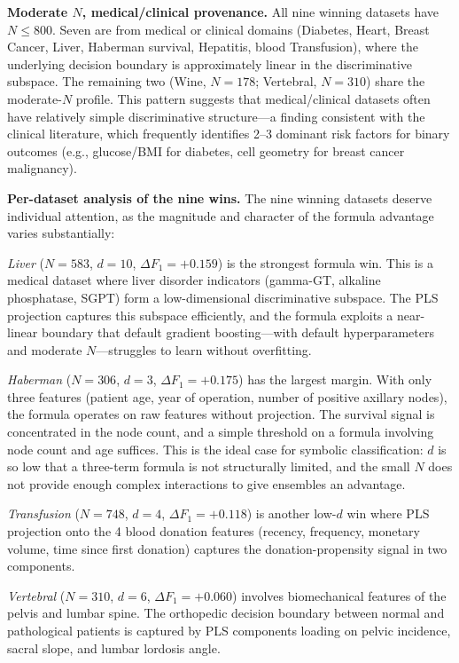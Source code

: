 \documentclass[journal]{IEEEtran}
\begin{document}
\textbf{Moderate $N$, medical/clinical provenance.}
All nine winning datasets have $N \leq 800$.  Seven are from
medical or clinical domains (Diabetes, Heart, Breast Cancer, Liver,
Haberman survival, Hepatitis, blood Transfusion), where the
underlying decision boundary is approximately linear in the
discriminative subspace.  The remaining two (Wine, $N = 178$;
Vertebral, $N = 310$) share the moderate-$N$ profile.  This pattern
suggests that medical/clinical datasets often have relatively simple
discriminative structure---a finding consistent with the clinical
literature, which frequently identifies 2--3 dominant risk factors
for binary outcomes (e.g., glucose/BMI for diabetes, cell geometry
for breast cancer malignancy).

\textbf{Per-dataset analysis of the nine wins.}
The nine winning datasets deserve individual attention, as the
magnitude and character of the formula advantage varies
substantially:

\emph{Liver} ($N = 583$, $d = 10$, $\Delta F_1 = +0.159$) is the
strongest formula win.  This is a medical dataset where liver
disorder indicators (gamma-GT, alkaline phosphatase, SGPT) form a
low-dimensional discriminative subspace.  The PLS projection
captures this subspace efficiently, and the formula exploits a
near-linear boundary that default gradient boosting---with default
hyperparameters and moderate $N$---struggles to learn without
overfitting.

\emph{Haberman} ($N = 306$, $d = 3$, $\Delta F_1 = +0.175$) has the
largest margin.  With only three features (patient age, year of
operation, number of positive axillary nodes), the formula operates
on raw features without projection.  The survival signal is
concentrated in the node count, and a simple threshold on a
formula involving node count and age suffices.  This is the ideal
case for symbolic classification: $d$ is so low that a three-term
formula is not structurally limited, and the small $N$ does not
provide enough complex interactions to give ensembles an advantage.

\emph{Transfusion} ($N = 748$, $d = 4$, $\Delta F_1 = +0.118$) is
another low-$d$ win where PLS projection onto the 4 blood donation
features (recency, frequency, monetary volume, time since first
donation) captures the donation-propensity signal in two components.

\emph{Vertebral} ($N = 310$, $d = 6$, $\Delta F_1 = +0.060$)
involves biomechanical features of the pelvis and lumbar spine.  The
orthopedic decision boundary between normal and pathological
patients is captured by PLS components loading on pelvic incidence,
sacral slope, and lumbar lordosis angle.
\end{document}
